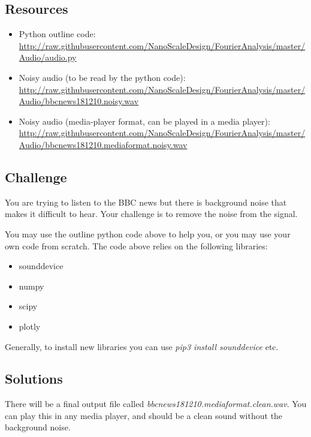 \subsection*{Resources}
\begin{itemize}
    \item Python outline code: \url{http://raw.githubusercontent.com/NanoScaleDesign/FourierAnalysis/master/Audio/audio.py}
    \item Noisy audio (to be read by the python code): \url{http://raw.githubusercontent.com/NanoScaleDesign/FourierAnalysis/master/Audio/bbcnews181210.noisy.wav}
    \item Noisy audio (media-player format, can be played in a media player): \url{http://raw.githubusercontent.com/NanoScaleDesign/FourierAnalysis/master/Audio/bbcnews181210.mediaformat.noisy.wav}
\end{itemize}

\subsection*{Challenge}
You are trying to listen to the BBC news but there is background noise that makes it difficult to hear. Your challenge is to remove the noise from the signal.

You may use the outline python code above to help you, or you may use your own code from scratch. The code above relies on the following libraries:
\begin{itemize}
    \item sounddevice
    \item numpy
    \item scipy
    \item plotly
\end{itemize}

Generally, to install new libraries you can use \emph{pip3 install sounddevice} etc.

\subsection*{Solutions}
There will be a final output file called \emph{bbcnews181210.mediaformat.clean.wav}.
You can play this in any media player, and should be a clean sound without the background noise.
\fi
